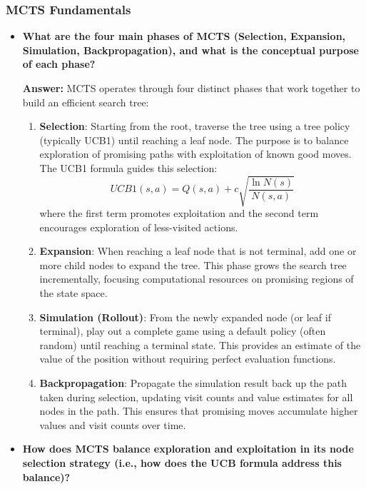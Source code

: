 \subsubsection{MCTS Fundamentals}
\begin{itemize}
    \item \textbf{What are the four main phases of MCTS (Selection, Expansion, Simulation, Backpropagation), and what is the conceptual purpose of each phase?}
    
    \textbf{Answer:} MCTS operates through four distinct phases that work together to build an efficient search tree:
    
    \begin{enumerate}
        \item \textbf{Selection}: Starting from the root, traverse the tree using a tree policy (typically UCB1) until reaching a leaf node. The purpose is to balance exploration of promising paths with exploitation of known good moves. The UCB1 formula guides this selection:
        \[UCB1(s,a) = Q(s,a) + c\sqrt{\frac{\ln N(s)}{N(s,a)}}\]
        where the first term promotes exploitation and the second term encourages exploration of less-visited actions.
        
        \item \textbf{Expansion}: When reaching a leaf node that is not terminal, add one or more child nodes to expand the tree. This phase grows the search tree incrementally, focusing computational resources on promising regions of the state space.
        
        \item \textbf{Simulation (Rollout)}: From the newly expanded node (or leaf if terminal), play out a complete game using a default policy (often random) until reaching a terminal state. This provides an estimate of the value of the position without requiring perfect evaluation functions.
        
        \item \textbf{Backpropagation}: Propagate the simulation result back up the path taken during selection, updating visit counts and value estimates for all nodes in the path. This ensures that promising moves accumulate higher values and visit counts over time.
    \end{enumerate}
    
    \item \textbf{How does MCTS balance exploration and exploitation in its node selection strategy (i.e., how does the UCB formula address this balance)?}
    

\end{itemize}
